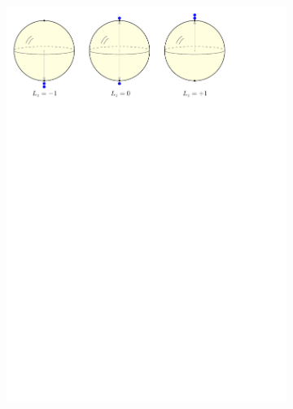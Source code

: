 \documentclass[12pt,final,3p]{elsarticle}
\begin{document}
\begin{figure}[h]
	\begin{subfigure}{0.6\textwidth}
		\includegraphics[width=\textwidth, keepaspectratio]{figures/majorana_spin1.pdf}
		\label{fig:bloch:spin1}
	\end{subfigure}
	\caption{}
	\label{fig:bloch}
\end{figure}
\end{document}
